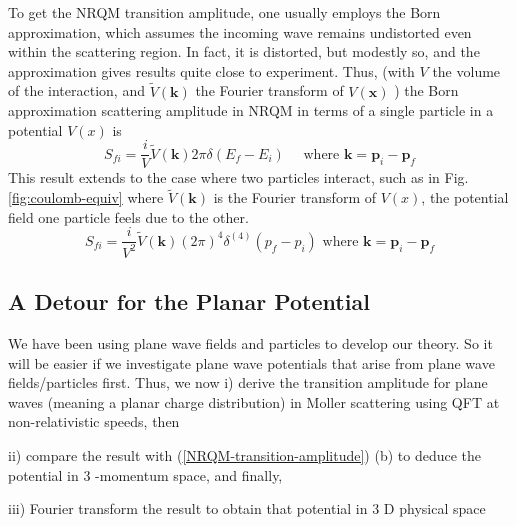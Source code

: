 To get the NRQM transition amplitude, one usually employs the Born approximation, which assumes the incoming wave remains undistorted even within the scattering region. In fact, it is distorted, but modestly so, and the approximation gives results quite close to experiment. Thus, (with $V$ the volume of the interaction, and $\tilde{V}(\mathbf{k})$ the Fourier transform of $V(\mathbf{x})$ ) the Born approximation scattering amplitude in NRQM in terms of a single particle in a potential $V(x)$ is
\begin{equation}S_{f i}=\frac{i}{V} \tilde{V}(\mathbf{k}) 2 \pi \delta\left(E_{f}-E_{i}\right) \quad \text { where } \mathbf{k}=\mathbf{p}_{i}-\mathbf{p}_{f}
\label{NRQM-transition-amplitude}
\end{equation}
This result extends to the case where two particles interact, such as in Fig. \ref{fig:coulomb-equiv} where $\tilde{V}(\mathbf{k})$ is the Fourier transform of $V(x)$, the potential field one particle feels due to the other.
\begin{equation}S_{f i}=\frac{i}{V^{2}} \tilde{V}(\mathbf{k})(2 \pi)^{4} \delta^{(4)}\left(p_{f}-p_{i}\right) \text { where } \mathbf{k}=\mathbf{p}_{i}-\mathbf{p}_{f}\end{equation}
\subsection{A Detour for the Planar Potential}
We have been using plane wave fields and particles to develop our theory. So it will be easier if we investigate plane wave potentials that arise from plane wave fields/particles first. Thus, we now
i) derive the transition amplitude for plane waves (meaning a planar charge distribution) in Moller scattering using QFT at non-relativistic speeds, then

ii) compare the result with (\ref{NRQM-transition-amplitude}) (b) to deduce the potential in 3 -momentum space, and finally,

iii) Fourier transform the result to obtain that potential in 3 D physical space

